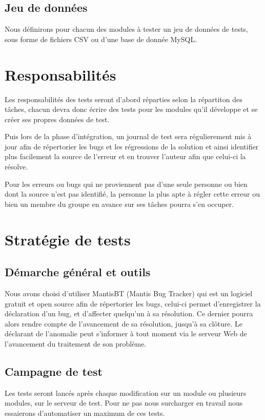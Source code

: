 \section{Jeu de données}
Nous définirons pour chacun des modules à tester un jeu de données de tests, sous forme de fichiers
CSV ou d'une base de donnée MySQL.
 
\chapter{Responsabilités}
Les responsabilités des tests seront d'abord réparties selon la répartiton des tâches, chacun
devra donc écrire des tests pour les modules qu'il développe et se créer ses propres données
de test.\newline

Puis lors de la phase d'intégration, un journal de test sera régulierement mis à jour
afin de répertorier les bugs et les régressions de la solution et ainsi identifier plus      
facilement la source de l'erreur et en trouver l'auteur afin que celui-ci la résolve.\newline

Pour les erreurs ou bugs qui ne proviennent pas d'une seule personne ou bien dont la source
n'est pas identifié, la personne la plus apte à régler cette erreur ou bien un membre du groupe
en avance sur ses tâches pourra s'en occuper.


\chapter{Stratégie de tests}

\section{Démarche général et outils}
\label{section:dem_gen}
Nous avons choisi d'utiliser MantisBT (Mantis Bug Tracker) qui est un logiciel gratuit
et open source afin de répertorier les bugs, celui-ci permet d'enregistrer la déclaration
d'un bug, et d'affecter quelqu'un à sa résolution. Ce dernier pourra alors rendre compte de
l'avancement de sa résolution, jusqu'à sa clôture. Le déclarant de l'anomalie peut  
s'informer à tout moment via le serveur Web de l'avancement du traitement de 
son problème.  

\section{Campagne de test}
Les tests seront lancés après chaque modification sur un module ou plusieurs modules, sur
le serveur de test. Pour ne pas nous surcharger en travail nous essaierons d'automatiser un
maximum de ces tests.

